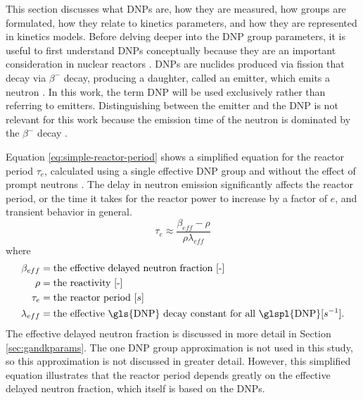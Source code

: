 This section discusses what \glspl{DNP} are, how they are measured, how groups are formulated, how they relate to kinetics parameters, and how they are represented in kinetics models.
Before delving deeper into the \gls{DNP} group parameters, it is useful to first understand \glspl{DNP} conceptually because they are an important consideration in nuclear reactors \cite{das1993importance}.
\Glspl{DNP} are nuclides produced via fission that decay via $\beta^-$ decay, producing a daughter, called an emitter, which emits a neutron \cite{bank2000jef}.
In this work, the term \gls{DNP} will be used exclusively rather than referring to emitters.
Distinguishing between the emitter and the \gls{DNP} is not relevant for this work because the emission time of the neutron is dominated by the $\beta^{-}$ decay \cite{bohr1939mechanism, ott1985introductory}.


Equation \eqref{eq:simple-reactor-period} shows a simplified equation for the reactor period $\tau_e$, calculated using a single effective \gls{DNP} group and without the effect of prompt neutrons \cite{NRC2006EquationsConversions}.
The delay in neutron emission significantly affects the reactor period, or the time it takes for the reactor power to increase by a factor of $e$, and transient behavior in general.
\begin{equation}
    \tau_e \approx \frac{\beta_{eff} - \rho}{\rho \lambda_{eff}}
    \label{eq:simple-reactor-period}
\end{equation}
where
\begin{align}
    \beta_{eff} &= \text{the effective delayed neutron fraction [-]} \nonumber \\
    \rho &= \text{the reactivity [-]} \nonumber \\
    \tau_e &= \text{the reactor period $[s]$} \nonumber \\
    \lambda_{eff} &= \text{the effective \gls{DNP} decay constant for all \glspl{DNP} [$s^{-1}$]}. \nonumber
\end{align}
The effective delayed neutron fraction is discussed in more detail in Section \ref{sec:gandkparams}.
The one \gls{DNP} group approximation is not used in this study, so this approximation is not discussed in greater detail.
However, this simplified equation illustrates that the reactor period depends greatly on the effective delayed neutron fraction, which itself is based on the \glspl{DNP}.

